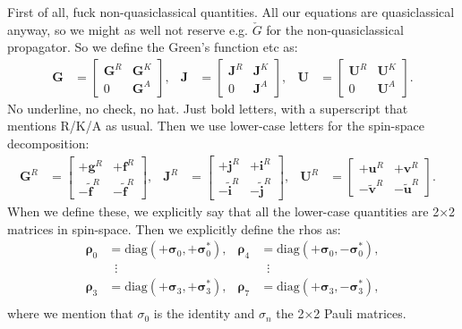 First of all, fuck non-quasiclassical quantities. All our equations are quasiclassical anyway, so we might as well not reserve e.g. $\check{G}$ for the non-quasiclassical propagator. 
So we define the Green's function etc as:
\begin{align}
\bm{G} &= \begin{bmatrix}\bm{G}^R & \bm{G}^K \\ 0 & \bm{G}^A \end{bmatrix}, &
\bm{J} &= \begin{bmatrix}\bm{J}^R & \bm{J}^K \\ 0 & \bm{J}^A \end{bmatrix}, &
\bm{U} &= \begin{bmatrix}\bm{U}^R & \bm{U}^K \\ 0 & \bm{U}^A \end{bmatrix}.
\end{align}
No underline, no check, no hat. Just bold letters, with a superscript that mentions R/K/A as usual.
Then we use lower-case letters for the spin-space decomposition:
\begin{align}
\bm{G}^R &= \begin{bmatrix}+\bm{g}^R & +\bm{f}^R \\ -\tilde{\bm{f}}^R & -\tilde{\bm{f}}^R \end{bmatrix}, &
\bm{J}^R &= \begin{bmatrix}+\bm{j}^R & +\bm{i}^R \\ -\tilde{\bm{i}}^R & -\tilde{\bm{j}}^R \end{bmatrix}, &
\bm{U}^R &= \begin{bmatrix}+\bm{u}^R & +\bm{v}^R \\ -\tilde{\bm{v}}^R & -\tilde{\bm{u}}^R \end{bmatrix}. &
\end{align}
When we define these, we explicitly say that all the lower-case quantities are 2×2 matrices in spin-space.
Then we explicitly define the rhos as:
\begin{align*}
  \bm\rho_0 &= \text{diag}(+\bm\sigma_0, +\bm\sigma_0^*), &
  \bm\rho_4 &= \text{diag}(+\bm\sigma_0, -\bm\sigma_0^*), \\
         &\;\;\vdots                             &
         &\;\;\vdots                             \\
  \bm\rho_3 &= \text{diag}(+\bm\sigma_3, +\bm\sigma_3^*), &
  \bm\rho_7 &= \text{diag}(+\bm\sigma_3, -\bm\sigma_3^*), \\
\end{align*}
where we mention that $\sigma_0$ is the identity and $\sigma_n$ the 2×2 Pauli matrices.
